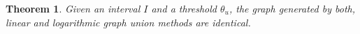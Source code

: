 \documentclass{sig-alternate}
\newtheorem{theorem}{Theorem}[section]
\begin{document}
\begin{theorem}
Given an interval $I$ and a threshold $\theta_u$, the graph generated by both, linear and logarithmic graph union methods are identical. 
\end{theorem}
%
%
%
\end{document}
